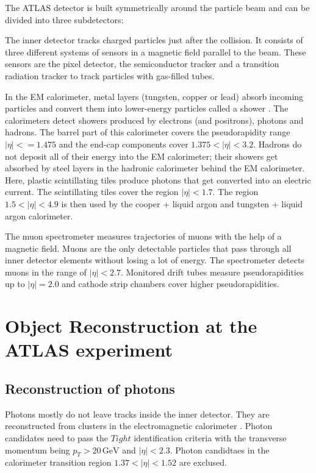The ATLAS detector is built symmetrically around the particle beam and can be divided into three subdetectors:

The inner detector \cite{innerdetector} tracks charged particles just after the collision. 
It consists of three different systems of sensors in a magnetic field parallel to the beam. 
These sensors are the pixel detector, the semiconductor tracker and a transition radiation tracker to track particles with gas-filled tubes. 

In the EM calorimeter, metal layers (tungsten, copper or lead) absorb incoming particles and convert them into lower-energy particles called a shower \cite{EMCal}. The calorimeters detect showers produced by electrons (and positrons), photons and hadrons. The barrel part of this calorimeter covers the pseudorapidity range $|\eta| < = 1.475$ and the end-cap components cover $1.375 <|\eta|< 3.2$.
Hadrons do not deposit all of their energy into the EM calorimeter; their showers get absorbed by steel layers in the hadronic calorimeter \cite{HADCal} behind the EM calorimeter. 
Here, plastic scintillating tiles produce photons that get converted into an electric current. The scintillating tiles cover the region $|\eta| < 1.7$. The region $1.5 < |\eta| < 4.9$ is then used by the cooper + liquid argon and tungsten + liquid argon calorimeter.

The muon spectrometer measures trajectories of muons with the help of a magnetic field. Muons are the only detectable particles that pass through all inner detector elements without losing a lot of energy. The spectrometer detects muons in the range of $\bigl|\eta\bigr| < 2.7$. 
Monitored drift tubes measure pseudorapidities up to $|\eta| = 2.0$ and cathode strip chambers cover higher pseudorapidities.  



\section{Object Reconstruction at the ATLAS experiment}
\label{sec:reconstruction}
\subsection{Reconstruction of photons}
\label{sec:reconphoton}

Photons mostly do not leave tracks inside the inner detector. They are reconstructed from clusters in the electromagnetic calorimeter \cite{EMCal}. Photon candidates need to pass the $Tight$ identification \cite{TightLH} criteria with the transverse momentum being $p_T >20\,\si{\giga\electronvolt}$ and $|\eta| < 2.3$. 
Photon candidtaes in the calorimeter transition region $1.37 < |\eta| < 1.52$ are exclused. 

